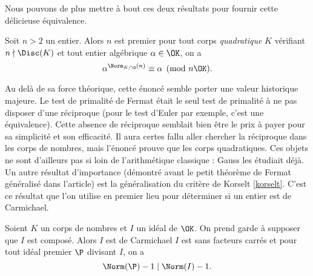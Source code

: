 Nous pouvons de plus mettre à bout ces deux résultats pour fournir cette délicieuse équivalence.

\begin{theoreme}\label{ptf-reciproque}
	Soit $n>2$ un entier. Alors $n$ est premier \ssi pour tout corps \emph{quadratique} $K$ vérifiant $n\nmid \Disc(K)$ et tout entier algébrique $\alpha \in \OK$, on a $$\alpha^{\Norm_{K/\Q}(n)} \equiv \alpha \pmod{n\OK}.$$
\end{theoreme}

Au delà de sa force théorique, cette énoncé semble porter une valeur historique majeure. Le test de primalité de Fermat était le seul test de primalité à ne pas disposer d'une réciproque (pour le test d'Euler par exemple, c'est une équivalence). Cette absence de réciproque semblait bien être le prix à payer pour sa simplicité et son efficacité. Il aura certes fallu aller chercher la réciproque dans les corps de nombres, mais l'énoncé prouve que les corps quadratiques. Ces objets ne sont d'ailleurs pas si loin de l'arithmétique classique : Gauss les étudiait déjà. \\

Un autre résultat d'importance (démontré avant le petit théorème de Fermat généralisé dans l'article) est la généralisation du critère de Korselt \ref{korselt}. C'est ce résultat que l'on utilise en premier lieu pour déterminer si un entier est de Carmichael.

\begin{theoreme}\label{korselt-generalise}
	Soient $K$ un corps de nombres et $I$ un idéal de $\OK$. On prend garde à supposer que $I$ est composé. Alors $I$ est de Carmichael \ssi $I$ est sans facteurs carrés et pour tout idéal premier $\P$ divisant $I$, on a $$\Norm(\P) - 1 \mid \Norm(I) - 1.$$
\end{theoreme}

